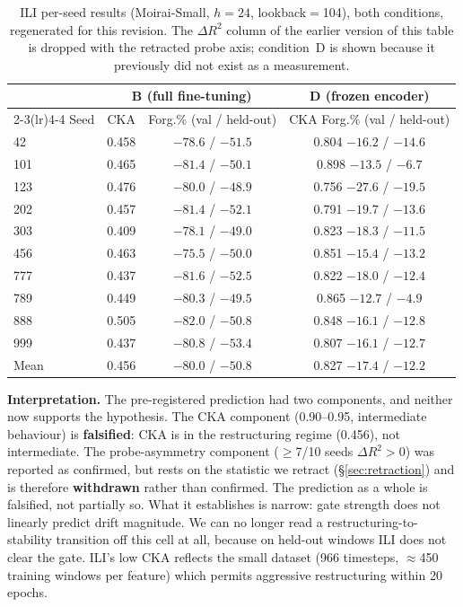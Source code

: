 \begin{table}[ht]
\centering\small
\caption{ILI per-seed results (Moirai-Small, $h{=}24$, lookback$=$104), both
conditions, regenerated for this revision. The $\Delta R^2$ column of the
earlier version of this table is dropped with the retracted probe axis;
condition~D is shown because it previously did not exist as a measurement.}
\label{tab:ili_perseed}
\begin{tabular}{@{}lccc@{}}
\toprule
 & \multicolumn{2}{c}{B (full fine-tuning)} & D (frozen encoder) \\
\cmidrule(lr){2-3}\cmidrule(lr){4-4}
Seed & CKA & Forg.\% (val / held-out) & CKA \quad Forg.\% (val / held-out) \\
\midrule
42  & 0.458 & $-78.6$ / $-51.5$ & 0.804 \quad $-16.2$ / $-14.6$ \\
101 & 0.465 & $-81.4$ / $-50.1$ & 0.898 \quad $-13.5$ / $-6.7$ \\
123 & 0.476 & $-80.0$ / $-48.9$ & 0.756 \quad $-27.6$ / $-19.5$ \\
202 & 0.457 & $-81.4$ / $-52.1$ & 0.791 \quad $-19.7$ / $-13.6$ \\
303 & 0.409 & $-78.1$ / $-49.0$ & 0.823 \quad $-18.3$ / $-11.5$ \\
456 & 0.463 & $-75.5$ / $-50.0$ & 0.851 \quad $-15.4$ / $-13.2$ \\
777 & 0.437 & $-81.6$ / $-52.5$ & 0.822 \quad $-18.0$ / $-12.4$ \\
789 & 0.449 & $-80.3$ / $-49.5$ & 0.865 \quad $-12.7$ / $-4.9$ \\
888 & 0.505 & $-82.0$ / $-50.8$ & 0.848 \quad $-16.1$ / $-12.8$ \\
999 & 0.437 & $-80.8$ / $-53.4$ & 0.807 \quad $-16.1$ / $-12.7$ \\
\midrule
Mean & 0.456 & $-80.0$ / $-50.8$ & 0.827 \quad $-17.4$ / $-12.2$ \\
\bottomrule
\end{tabular}
\end{table}

\textbf{Interpretation.}
The pre-registered prediction had two components, and neither now supports
the hypothesis. The CKA component (0.90--0.95, intermediate behaviour) is
\textbf{falsified}: CKA is in the restructuring regime (0.456), not
intermediate. The probe-asymmetry component (${\geq}$7/10 seeds
$\Delta R^2{>}0$) was reported as confirmed, but rests on the statistic we
retract (\S\ref{sec:retraction}) and is therefore \textbf{withdrawn} rather
than confirmed. The prediction as a whole is falsified, not partially so.
What it establishes is narrow: gate strength does not linearly predict drift
magnitude. We can no longer read a restructuring-to-stability transition off
this cell at all, because on held-out windows ILI does not clear the gate.
ILI's low CKA reflects the small dataset (966 timesteps, ${\approx}$450
training windows per feature) which permits aggressive restructuring
within 20 epochs.

